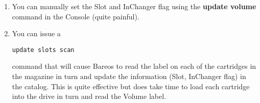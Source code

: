 \begin{enumerate}
\item You can manually set the Slot and InChanger flag using  the {\bf update
   volume} command in the Console (quite  painful).

\item You can issue a

\footnotesize
\begin{verbatim}
update slots scan
\end{verbatim}
\normalsize

   command that will cause Bareos to read the label on each  of the cartridges in
   the magazine in turn and update the  information (Slot, InChanger flag) in the
   catalog. This  is quite effective but does take time to load each cartridge
   into the drive in turn and read the Volume label.

\end{enumerate}

